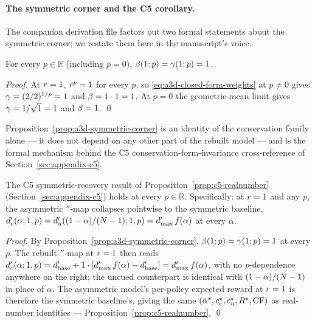 \paragraph{The symmetric corner and the C5 corollary.}
The companion derivation file factors out two formal statements
about the symmetric corner; we restate them here in the
manuscript's voice.

\begin{proposition}[Symmetric corner identity, $\Rsens = 1$ is
conservation-form-invariant]
\label{prop:a3d-symmetric-corner}
For every $p \in \mathbb{R}$ (including $p = 0$),
$\beta(1; p) = \gamma(1; p) = 1$.
\end{proposition}

\begin{proof}
At $\Rsens = 1$, $r^p = 1$ for every $p$, so
\eqref{eq:a3d-closed-form-weights} at $p \ne 0$ gives
$\gamma = (2/2)^{1/p} = 1$ and $\beta = 1 \cdot 1 = 1$. At
$p = 0$ the geometric-mean limit gives
$\gamma = 1/\sqrt{1} = 1$ and $\beta = 1$. \qed
\end{proof}

Proposition~\ref{prop:a3d-symmetric-corner} is an identity of the
conservation family alone — it does not depend on any other part
of the rebuilt model — and is the formal mechanism behind the C5
conservation-form-invariance cross-reference of
Section~\ref{sec:appendix-c5}.

\begin{corollary}
\label{cor:a3d-c5-invariance}
The C5 symmetric-recovery result of
Proposition~\ref{prop:c5-realnumber} (Section~\ref{sec:appendix-c5})
holds at every $p \in \mathbb{R}$. Specifically: at $\Rsens = 1$
and any $p$, the asymmetric $\dprime$-map collapses pointwise to
the symmetric baseline, $d'_c(\alpha; 1, p) =
d'_u((1 - \alpha)/(N - 1); 1, p) = d'_{\max}\,f(\alpha)$
at every $\alpha$.
\end{corollary}

\begin{proof}
By Proposition~\ref{prop:a3d-symmetric-corner},
$\beta(1; p) = \gamma(1; p) = 1$ at every $p$. The rebuilt
$\dprime$-map at $\Rsens = 1$ then reads
$d'_c(\alpha; 1, p) = d'_{\mathrm{base}} + 1 \cdot
[d'_{\max}\,f(\alpha) - d'_{\mathrm{base}}] = d'_{\max}\,
f(\alpha)$, with no $p$-dependence anywhere on the right; the
uncued counterpart is identical with $(1 - \alpha)/(N - 1)$
in place of $\alpha$. The asymmetric model's per-policy expected
reward at $\Rsens = 1$ is therefore the symmetric baseline's,
giving the same $(\alpha^\star, c_c^\star, c_u^\star, R^\star,
\mathrm{CF})$ as real-number identities — Proposition~\ref{prop:c5-realnumber}.
\qed
\end{proof}


